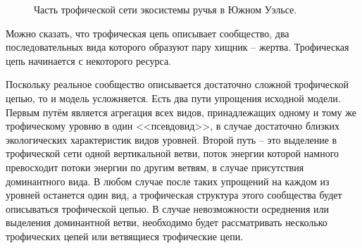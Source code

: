 \begin{figure}[H]
        \caption{Часть трофической сети экосистемы ручья в Южном Уэльсе.} \label{small_river_graph}
    \end{figure}

    Можно сказать, что трофическая цепь описывает сообщество, два последовательных вида которого образуют пару хищник -- жертва. Трофическая цепь начинается с некоторого ресурса.

    Поскольку реальное сообщество описывается достаточно сложной трофической цепью, то и модель усложняется. Есть два пути упрощения исходной модели. Первым путём является агрегация всех видов, принадлежащих одному и тому же трофическому уровню в один <<псевдовид>>, в случае достаточно близких экологических характеристик видов уровней. Второй путь -- это выделение в трофической сети одной вертикальной ветви, поток энергии которой намного превосходит потоки энергии по другим ветвям, в случае присутствия доминантного вида. В любом случае после таких упрощений на каждом из уровней останется один вид, а трофическая структура этого сообщества будет описываться трофической цепью. В случае невозможности осреднения или выделения доминантной ветви, необходимо будет рассматривать несколько трофических цепей или ветвящиеся трофические цепи.

